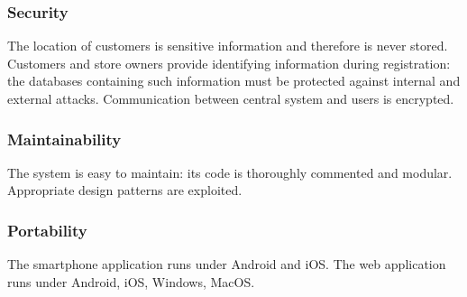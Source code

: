 \subsubsection{Security}
The location of customers is sensitive information and therefore is never stored. Customers and store owners provide identifying information during registration: the databases containing such information must be protected against internal and external attacks. Communication between central system and users is encrypted.
\subsubsection{Maintainability}
The system is easy to maintain: its code is thoroughly commented and modular. Appropriate design patterns are exploited.
\subsubsection{Portability}
The smartphone application runs under Android and iOS. The web application runs under Android, iOS, Windows, MacOS.